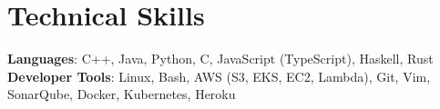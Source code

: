 \documentclass[letterpaper,11pt]{article}
\begin{document}
\section{Technical Skills}
 \begin{itemize}[leftmargin=0.15in, label={}]
    \small{\item{
     \textbf{Languages}{: C++, Java, Python, C, JavaScript (TypeScript), Haskell, Rust} \\
     \textbf{Developer Tools}{: Linux, Bash, AWS (S3, EKS, EC2, Lambda), Git, Vim, SonarQube, Docker, Kubernetes, Heroku} \\
    }}
 \end{itemize}


\end{document}
